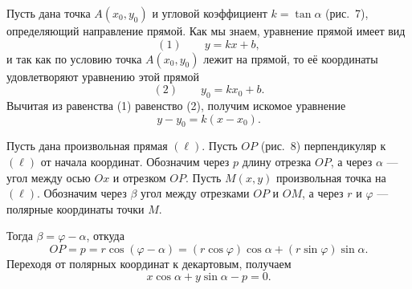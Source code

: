 \begin{rusblock}
Пусть дана точка $A(x_0,y_0)$ и угловой коэффициент $k=\tan\alpha$ (рис.~7), определяющий направление прямой. Как мы знаем, уравнение прямой имеет вид
\[(1)\qquad y=kx+b,
\]
и так как по условию точка $A(x_0,y_0)$ лежит на прямой, то её координаты удовлетворяют уравнению этой прямой
\[(2)\qquad y_0=kx_0+b.
\]
Вычитая из равенства (1) равенство (2), получим искомое уравнение
\[
y-y_0=k(x-x_0).
\]
\end{rusblock}

\begin{rusblock}
Пусть дана произвольная прямая $(\ell)$. Пусть $OP$ (рис.~8) перпендикуляр к $(\ell)$ от начала координат. Обозначим через $p$ длину отрезка $OP$, а через $\alpha$ --- угол между осью $Ox$ и отрезком $OP$. Пусть $M(x,y)$ произвольная точка на $(\ell)$. Обозначим через $\beta$ угол между отрезками $OP$ и $OM$, а через $r$ и $\varphi$ --- полярные координаты точки $M$.

Тогда $\beta=\varphi-\alpha$, откуда
\[
OP=p=r\cos(\varphi-\alpha)=(r\cos\varphi)\cos\alpha+(r\sin\varphi)\sin\alpha.
\]
Переходя от полярных координат к декартовым, получаем
\[
x\cos\alpha+y\sin\alpha-p=0.
\]
\end{rusblock}

